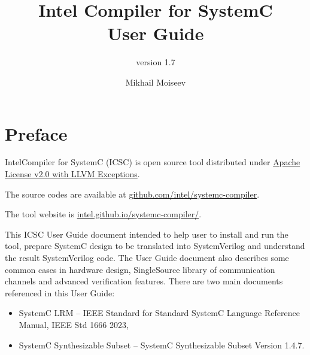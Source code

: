 



 
\title[Intel Compiler for SystemC User Guide]{Intel Compiler for SystemC \\ User Guide}
\subtitle{version 1.7}

\author{Mikhail Moiseev}
\ifdefined\INTEL
{}
\else
{}
\fi


\maketitle
\pagebreak

\setcounter{tocdepth}{2}
\tableofcontents


\pagebreak

\section{Preface}

Intel\textregistered Compiler for SystemC (ICSC) is open source tool distributed under \href{https://github.com/intel/systemc-compiler/blob/main/LICENSE.txt}{Apache License v2.0 with LLVM Exceptions}. 

The source codes are available at \href{https://github.com/intel/systemc-compiler}{github.com/intel/systemc-compiler}. 

The tool website is \href{https://intel.github.io/systemc-compiler/}{intel.github.io/systemc-compiler/}.


This ICSC User Guide document intended to help user to install and run the tool, prepare SystemC design to be translated into SystemVerilog and understand the result SystemVerilog code. The User Guide document also describes some common cases in hardware design, SingleSource library of communication channels and advanced verification features.
%
There are two main documents referenced in this User Guide: 
\begin{itemize}
\item SystemC LRM -- IEEE Standard for Standard SystemC Language Reference Manual, IEEE Std 1666 2023,
\item SystemC Synthesizable Subset -- SystemC Synthesizable Subset Version 1.4.7. 
\end{itemize}

